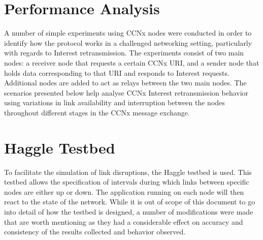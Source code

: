 \documentclass[a4paper,12pt]{report}      %
\begin{document}
\section{Performance Analysis}

A number of simple experiments using CCNx nodes were conducted in order to identify how the
protocol works in a challenged networking setting, particularly with regards to Interest retransmission.
The experiments consist of two main nodes: a receiver node that requests a certain CCNx URI, and a
sender node that holds data corresponding to that URI and responds to Interest requests. Additional
nodes are added to act as relays between the two main nodes. The scenarios presented below help
analyse CCNx Interest retransmission behavior using variations in link availability and interruption
between the nodes throughout different stages in the CCNx message exchange.

\section{Haggle Testbed}

To facilitate the simulation of link disruptions, the Haggle testbed \cite{haggle} is used. 
This testbed allows the specification of intervals during
which links between specific nodes are either up or down. The application running on each node will
then react to the state of the network. While it is out of scope of this document to go into detail of how
the testbed is designed, a number of modifications were made that are worth mentioning as they had a
considerable effect on accuracy and consistency of the results collected and behavior observed.
\end{document}
